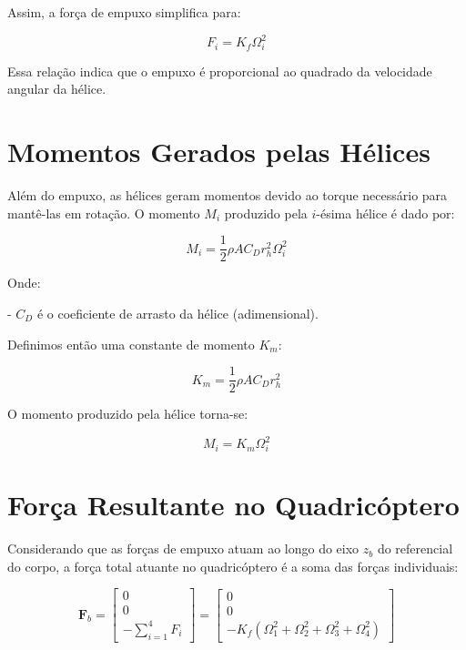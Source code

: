 Assim, a força de empuxo simplifica para:

\begin{equation}
F_i = K_f \Omega_i^2
\label{eq:forca_empuxo_simplificada}
\end{equation}

Essa relação indica que o empuxo é proporcional ao quadrado da velocidade angular da hélice.

\section{Momentos Gerados pelas Hélices}

Além do empuxo, as hélices geram momentos devido ao torque necessário para mantê-las em rotação. O momento \( M_i \) produzido pela \( i \)-ésima hélice é dado por:

\begin{equation}
M_i = \frac{1}{2} \rho A C_D r_h^2 \Omega_i^2
\label{eq:momento_helice}
\end{equation}

Onde:

- \( C_D \) é o coeficiente de arrasto da hélice (adimensional).

Definimos então uma constante de momento \( K_m \):

\begin{equation}
K_m = \frac{1}{2} \rho A C_D r_h^2
\label{eq:constante_momento}
\end{equation}

O momento produzido pela hélice torna-se:

\begin{equation}
M_i = K_m \Omega_i^2
\label{eq:momento_helice_simplificado}
\end{equation}

\section{Força Resultante no Quadricóptero}

Considerando que as forças de empuxo atuam ao longo do eixo \( z_b \) do referencial do corpo, a força total atuante no quadricóptero é a soma das forças individuais:

\begin{equation}
\mathbf{F}_b = \begin{bmatrix}
0 \\
0 \\
- \sum_{i=1}^{4} F_i
\end{bmatrix}
= \begin{bmatrix}
0 \\
0 \\
- K_f (\Omega_1^2 + \Omega_2^2 + \Omega_3^2 + \Omega_4^2)
\end{bmatrix}
\label{eq:forca_total_quadricoptero}
\end{equation}

